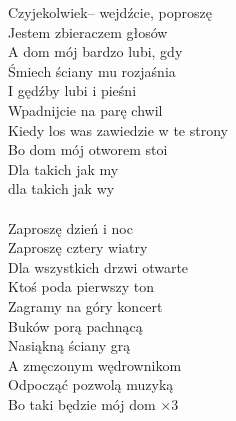 \documentclass[a5paper, 10pt]{book}
\begin{document}
\begin{minipage}[t]{0.65\textwidth}
Czyjekolwiek– wejdźcie, poproszę\\
Jestem zbieraczem głosów\\
A dom mój bardzo lubi, gdy\\
Śmiech ściany mu rozjaśnia\\
I gędźby lubi i pieśni\\
Wpadnijcie na parę chwil\\
Kiedy los was zawiedzie w te strony\\
Bo dom mój otworem stoi\\
Dla takich jak my\\ dla takich jak wy\\
\\
Zaproszę dzień i noc\\
Zaproszę cztery wiatry\\
Dla wszystkich drzwi otwarte\\
Ktoś poda pierwszy ton\\
Zagramy na góry koncert\\
Buków porą pachnącą\\
Nasiąkną ściany grą\\
A zmęczonym wędrownikom\\
Odpocząć pozwolą muzyką\\
Bo taki będzie mój dom $\times 3$\\

\end{minipage}
\end{document}

